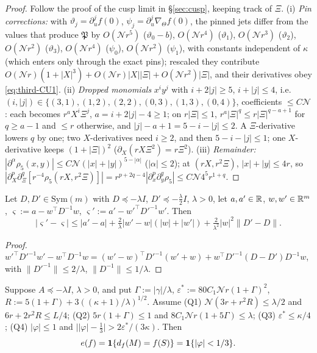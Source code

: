 \begin{proof}
Follow the proof of the cusp limit in \S\ref{sec:cusp}, keeping track of $\Xi$. (i) \emph{Pin corrections:} with $\vartheta_j=\partial_u^jf(0)$, $\psi_j=\partial_u^j\nabla_\Theta f(0)$, the pinned jets differ from the values that produce $\mathfrak P$ by $O(\mathcal Nr^5)$ ($\vartheta_0-b$), $O(\mathcal Nr^4)$ ($\vartheta_1$), $O(\mathcal Nr^3)$ ($\vartheta_2$), $O(\mathcal Nr^2)$ ($\vartheta_3$), $O(\mathcal Nr^4)$ ($\psi_0$), $O(\mathcal Nr^2)$ ($\psi_1$), with constants independent of $\kappa$ (which enters only through the exact pins); rescaled they contribute $O(\mathcal Nr)(1+|X|^3)+O(\mathcal Nr)|X||\Xi|+O(\mathcal Nr^2)|\Xi|$, and their derivatives obey \eqref{eq:third-CU1}. (ii) \emph{Dropped monomials} $x^iy^j$ with $i+2|j|\ge5$, $i+|j|\le4$, i.e.\ $(i,|j|)\in\{(3,1),(1,2),(2,2),(0,3),(1,3),(0,4)\}$, coefficients $\le C\mathcal N$: each becomes $r^aX^i\Xi^j$, $a=i+2|j|-4\ge1$; on $r|\Xi|\le1$, $r^a|\Xi|^q\le r|\Xi|^{q-a+1}$ for $q\ge a-1$ and $\le r$ otherwise, and $|j|-a+1=5-i-|j|\le2$. A $\Xi$-derivative lowers $q$ by one; two $X$-derivatives need $i\ge2$, and then $5-i-|j|\le1$; one $X$-derivative keeps $(1+|\Xi|)^2$ ($\partial_X(rX\Xi^2)=r\Xi^2$). (iii) \emph{Remainder:} $|\partial^\alpha\rho_5(x,y)|\le C\mathcal N(|x|+|y|)^{5-|\alpha|}$ ($|\alpha|\le2$); at $(rX,r^2\Xi)$, $|x|+|y|\le4r$, so $|\partial_X^p\partial_\Xi^q[r^{-4}\rho_5(rX,r^2\Xi)]|=r^{p+2q-4}|\partial_x^p\partial_y^q\rho_5|\le C\mathcal N4^5r^{1+q}$.
\end{proof}

\begin{lemma}\label{lem:third-S}
Let $D,D'\in\mathrm{Sym}(m)$ with $D\preceq-\lambda I$, $D'\preceq-\frac\lambda2I$, $\lambda>0$, let $a,a'\in\mathbb R$, $w,w'\in\mathbb R^m$, $\varsigma:=a-w^\top D^{-1}w$, $\varsigma':=a'-w'^\top D'^{-1}w'$. Then
\begin{equation}\label{eq:third-Schur}
|\varsigma'-\varsigma|\le|a'-a|+\tfrac2\lambda|w'-w|(|w|+|w'|)+\tfrac2{\lambda^2}|w|^2\|D'-D\|.
\end{equation}
\end{lemma}

\begin{proof}
$w'^\top D'^{-1}w'-w^\top D^{-1}w=(w'-w)^\top D'^{-1}(w'+w)+w^\top D'^{-1}(D-D')D^{-1}w$, with $\|D'^{-1}\|\le2/\lambda$, $\|D^{-1}\|\le1/\lambda$.
\end{proof}

\begin{lemma}\label{lem:third-Q}
Suppose $A\preceq-\lambda I$, $\lambda>0$, and put $\Gamma:=|\gamma|/\lambda$, $\varepsilon^*:=80C_1\mathcal Nr(1+\Gamma)^2$, $R:=5(1+\Gamma)+3((\kappa+1)/\lambda)^{1/2}$. Assume
\textup{(Q1)} $\mathcal N(3r+r^2R)\le\lambda/2$ and $6r+2r^2R\le L/4$;
\textup{(Q2)} $5r(1+\Gamma)\le1$ and $8C_1\mathcal Nr(1+5\Gamma)\le\lambda$;
\textup{(Q3)} $\varepsilon^*\le\kappa/4$;
\textup{(Q4)} $|\varphi|\le1$ and $\bigl||\varphi|-\frac13\bigr|>2\varepsilon^*/(3\kappa)$.
Then
\begin{equation}\label{eq:third-decision}
e(f)=\mathbf 1\{d_f(M)=f(S)\}=\mathbf 1\{|\varphi|<1/3\}.
\end{equation}
\end{lemma}

